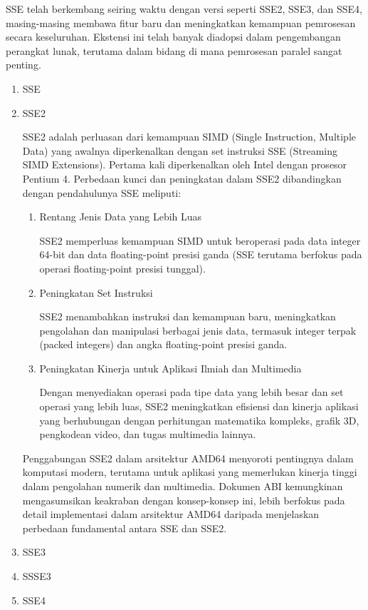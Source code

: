SSE telah berkembang seiring waktu dengan versi seperti SSE2, SSE3, dan SSE4, masing-masing membawa fitur baru dan meningkatkan kemampuan pemrosesan secara keseluruhan. Ekstensi ini telah banyak diadopsi dalam pengembangan perangkat lunak, terutama dalam bidang di mana pemrosesan paralel sangat penting.
\begin{enumerate}
	\item SSE
	\item SSE2 
	
	SSE2 adalah perluasan dari kemampuan SIMD (Single Instruction, Multiple Data) yang awalnya diperkenalkan dengan set instruksi SSE (Streaming SIMD Extensions). Pertama kali diperkenalkan oleh Intel dengan prosesor Pentium 4\cite{SystemVAppBinaryInterfaceMichael}. Perbedaan kunci dan peningkatan dalam SSE2 dibandingkan dengan pendahulunya SSE meliputi:
	
	\begin{enumerate}
		\item Rentang Jenis Data yang Lebih Luas 
		
		SSE2 memperluas kemampuan SIMD untuk beroperasi pada data integer 64-bit dan data floating-point presisi ganda (SSE terutama berfokus pada operasi floating-point presisi tunggal).
		
		\item Peningkatan Set Instruksi
		
		SSE2 menambahkan instruksi dan kemampuan baru, meningkatkan pengolahan dan manipulasi berbagai jenis data, termasuk integer terpak (packed integers) dan angka floating-point presisi ganda.
		
		\item Peningkatan Kinerja untuk Aplikasi Ilmiah dan Multimedia
		
		Dengan menyediakan operasi pada tipe data yang lebih besar dan set operasi yang lebih luas, SSE2 meningkatkan efisiensi dan kinerja aplikasi yang berhubungan dengan perhitungan matematika kompleks, grafik 3D, pengkodean video, dan tugas multimedia lainnya.
	\end{enumerate}
	
	Penggabungan SSE2 dalam arsitektur AMD64 menyoroti pentingnya dalam komputasi modern, terutama untuk aplikasi yang memerlukan kinerja tinggi dalam pengolahan numerik dan multimedia. Dokumen ABI kemungkinan mengasumsikan keakraban dengan konsep-konsep ini, lebih berfokus pada detail implementasi dalam arsitektur AMD64 daripada menjelaskan perbedaan fundamental antara SSE dan SSE2\cite{SystemVAppBinaryInterfaceMichael}.
	\item SSE3
	\item SSSE3
	\item SSE4
	\cite{Tseng2009}
\end{enumerate}
\iffalse
